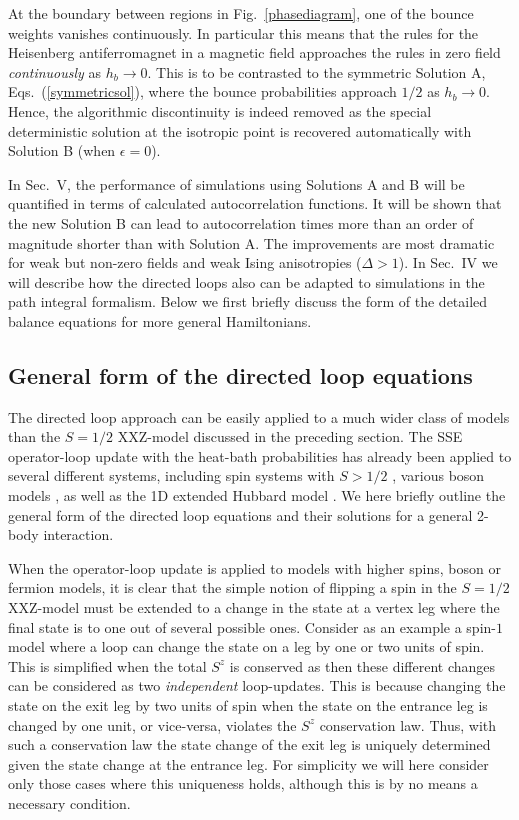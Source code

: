 \documentclass[10pt,pre,aps,twocolumn,showpacs,superscriptaddress,
floatfix]{revtex4}
\begin{document}
At the boundary between regions in Fig.~\ref{phasediagram}, one of the bounce 
weights vanishes continuously. In 
particular this means that the rules for the Heisenberg antiferromagnet in a 
magnetic field approaches the rules in zero field {\em continuously} as 
$h_b \to 0$. This is to be contrasted to the symmetric Solution A, 
Eqs.~(\ref{symmetricsol}), where the bounce probabilities approach $1/2$ 
as $h_b\to 0$. Hence, the algorithmic discontinuity is indeed removed as
the special deterministic solution at the isotropic point is recovered 
automatically with Solution B (when $\epsilon=0$).

In Sec.~V, the performance of simulations using Solutions A and B will 
be quantified in terms of calculated autocorrelation functions. It will
be shown that the new Solution B can lead to autocorrelation times 
more than an order of magnitude shorter than with Solution A. The
improvements are most dramatic for weak but non-zero fields and weak
Ising anisotropies ($\Delta > 1$). In Sec.~IV we will describe how the 
directed loops also can be adapted to simulations in the path integral 
formalism. Below we first briefly discuss the form of the detailed
balance equations for more general Hamiltonians.

\subsection{General form of the directed loop equations}

The directed loop approach can be easily applied to a much wider class of
models than the $S=1/2$ XXZ-model discussed in the preceding section. The SSE 
operator-loop update with the heat-bath probabilities \cite{sse3} has already 
been applied to several different systems, including spin systems with $S>1/2$
\cite{henelius2}, various boson models \cite{hebert,dorneich1,schmid}, as well 
as the 1D extended Hubbard model \cite{pinaki}. We here briefly outline the 
general form of the directed loop equations and their solutions for a 
general 2-body interaction.

When the operator-loop update is applied to models with higher spins, boson 
or fermion models, it is clear that the simple notion of flipping a spin in 
the $S=1/2$ XXZ-model must be extended to a change in the state at a 
vertex leg where the final state is to one out of several possible ones. 
Consider as an example a spin-$1$ model where a loop can  change the state on 
a leg by one or two units of spin. This is simplified when the total $S^z$ is 
conserved as then these different changes can be considered as two 
{\em independent} loop-updates. This is because changing the state on the exit
leg by two units of spin when the state on the entrance leg is changed by one 
unit, or vice-versa, violates the $S^z$ conservation law. Thus, with such a 
conservation law the state change of the exit leg is uniquely determined given 
the state change at the entrance leg. For simplicity we will here consider 
only those cases where this uniqueness holds, although this is by no means 
a necessary condition. 
    
\end{document}
